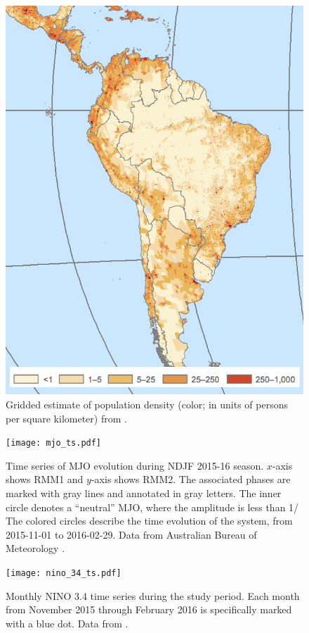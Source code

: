 \documentclass{article}
\begin{document}
\begin{figure}
	\centering
  \includegraphics[width=\textwidth,height=0.6\textheight,keepaspectratio=true]{gpw-v4-2015.png}
	\caption{
		Gridded estimate of population density (color; in units of persons per square kilometer) from \citet{GPWv4}.
	}
\end{figure}

\begin{figure}
	\texttt{[image: mjo\_ts.pdf]}
	\caption{
		Time series of MJO evolution during NDJF 2015-16 season.
		$x$-axis shows RMM1 and $y$-axis shows RMM2.
		The associated phases are marked with gray lines and annotated in gray letters.
		The inner circle denotes a ``neutral'' MJO, where the amplitude is less than 1/
		The colored circles describe the time evolution of the system, from 2015-11-01 to 2016-02-29.
		Data from Australian Bureau of Meteorology \citep{Wheeler2004}.
	}
\end{figure}

\begin{figure}
	\texttt{[image: nino\_34\_ts.pdf]}
	\caption{
		Monthly NINO 3.4 time series during the study period.
		Each month from November 2015 through February 2016 is specifically marked with a blue dot.
		Data from \citet{Kaplan1998}.
	}
\end{figure}
\end{document}
